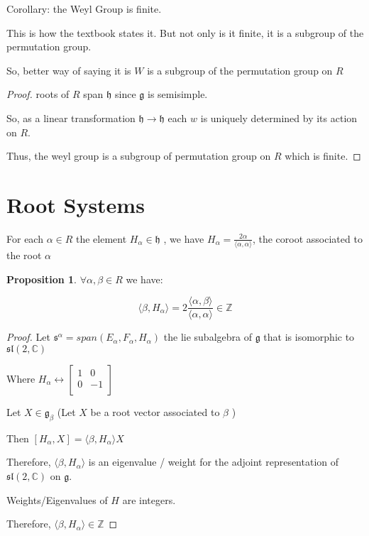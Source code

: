 \documentclass{article}
\theoremstyle{definition}
\newtheorem{proposition}{Proposition}
\begin{document}
Corollary: the Weyl Group is finite.

This is how the textbook states it. But not only is it finite, it is a subgroup of the permutation group.

So, better way of saying it is \(W\) is a subgroup of the permutation group on \(R\) 

\begin{proof}
    roots of \(R\) span \(\mathfrak{h} \) since \(\mathfrak{g} \) is semisimple.

    So, as a linear transformation \(\mathfrak{h} \to \mathfrak{h} \) each \(w\) is uniquely determined by its action on \(R\).

    Thus, the weyl group is a subgroup of permutation group on \(R\) which is finite.

\end{proof}

\section*{Root Systems}

For each \(\alpha \in R\) the element \(H_\alpha \in \mathfrak{h} \) , we have \(H_\alpha = \frac{2\alpha}{\langle \alpha ,\alpha  \rangle }\), the coroot associated to the root \(\alpha\) 

\begin{proposition}
    \(\forall \alpha ,\beta \in R\) we have:

    \[
        \langle \beta , H_\alpha \rangle = 2 \frac{\langle \alpha ,\beta  \rangle }{\langle \alpha ,\alpha  \rangle } \in \mathbb{Z}
    \] 

\end{proposition}

\begin{proof}
    
    Let \(\mathfrak{s}^\alpha = span(E_\alpha ,F_\alpha ,H_\alpha) \) the lie subalgebra of \(\mathfrak{g} \) that is isomorphic to \(\mathfrak{sl}(2,\mathbb{C}) \)  

    Where \(H_\alpha  \leftrightarrow \begin{bmatrix}
        1 &  0 \\
        0 &  -1 \\
    \end{bmatrix}\) 

    Let \(X\in \mathfrak{g}_\beta \) (Let \(X\) be a root vector associated to \(\beta\) ) 

    Then \([H_\alpha ,X] = \langle \beta ,H_\alpha \rangle X \) 

    Therefore, \(\langle \beta ,H_\alpha \rangle \) is an eigenvalue / weight for the adjoint representation of \(\mathfrak{sl}(2,\mathbb{C}) \) on \(\mathfrak{g}\).

    Weights/Eigenvalues of \(H\) are integers.

    Therefore, \(\langle \beta , H_\alpha \rangle \in \mathbb{Z}\) 


\end{proof}
\end{document}
